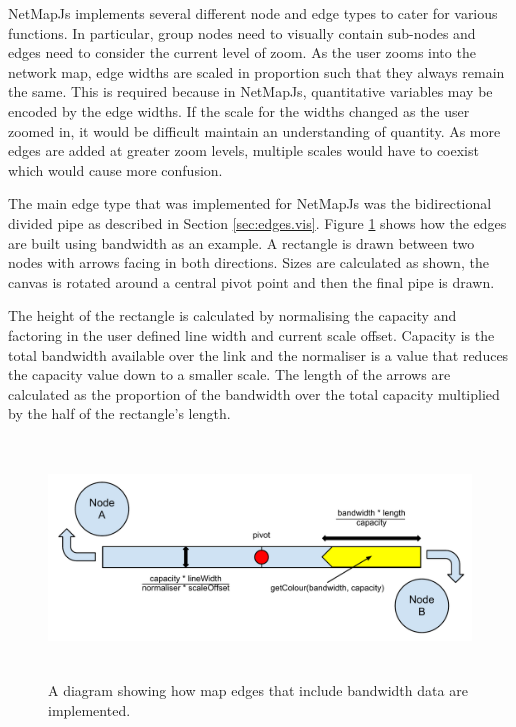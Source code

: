 \documentclass[11pt, a4paper]{article}
\begin{document}
NetMapJs implements several different node and edge types to cater for various
functions. In particular, group nodes need to visually contain sub-nodes and
edges need to consider the current level of zoom. As the user zooms into the
network map, edge widths are scaled in proportion such that they always remain
the same. This is required because in NetMapJs, quantitative variables may be
encoded by the edge widths. If the scale for the widths changed as the user
zoomed in, it would be difficult maintain an understanding of quantity. As more
edges are added at greater zoom levels, multiple scales would have to coexist
which would cause more confusion.

The main edge type that was implemented for NetMapJs was the bidirectional
divided pipe as described in Section \ref{sec:edges.vis}. Figure
\ref{fig:nodesedges1.0} shows how the edges are built using bandwidth as an
example. A rectangle is drawn between two nodes with arrows facing in both
directions. Sizes are calculated as shown, the canvas is rotated around a
central pivot point and then the final pipe is drawn.

The height of the rectangle is calculated by normalising the capacity and
factoring in the user defined line width and current scale offset.
Capacity is the total bandwidth available over the link and the normaliser is a
value that reduces the capacity value down to a smaller scale. The length of the
arrows are calculated as the proportion of the bandwidth over the total capacity
multiplied by the half of the rectangle's length.



\begin{figure}
\centering
\includegraphics[width=170mm,height=63.24mm]{assets/nodesedges1-0.pdf}
\caption{A diagram showing how map edges that include bandwidth data are implemented.}
\label{fig:nodesedges1.0}
\end{figure}
\end{document}
